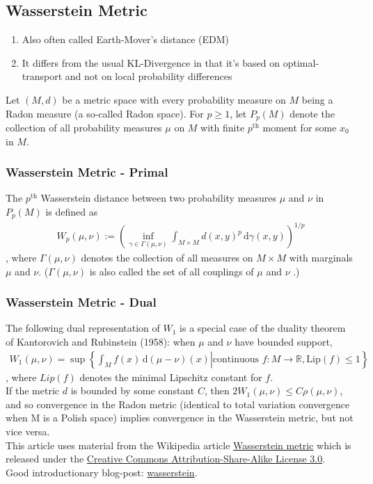 \subsection{Wasserstein Metric}
\begin{enumerate}
	\item Also often called Earth-Mover's distance (EDM)
	\item It differs from the usual KL-Divergence in that it's based on optimal-transport and not on local probability differences
\end{enumerate}
Let $(M,d)$ be a metric space with every probability measure on $M$ being a Radon measure (a so-called Radon space). For $p\geq 1$, let $\displaystyle P_{p}(M)$ denote the collection of all probability measures $\mu$ on $M$ with finite $\displaystyle p^{\text{th}}$ moment for some $x_{0}$ in $M$.
\subsubsection{Wasserstein Metric - Primal}
The $\displaystyle p^{\text{th}}$ Wasserstein distance between two probability measures $\mu$ and $\nu$ in $\displaystyle P_{p}(M)$ is defined as
\begin{align*}
W_{{p}}(\mu ,\nu ):=\left(\inf _{{\gamma \in \Gamma (\mu ,\nu )}}\int _{{M\times M}}d(x,y)^{{p}}\,{\mathrm  {d}}\gamma (x,y)\right)^{{1/p}}
\end{align*},
where $\displaystyle \Gamma (\mu ,\nu )$ denotes the collection of all measures on $M\times M$ with marginals $\mu$  and $\nu$. ($\Gamma (\mu ,\nu )$ is also called the set of all couplings of $\mu$  and $\nu$ .)
\subsubsection{Wasserstein Metric - Dual}
The following dual representation of $W_1$ is a special case of the duality theorem of Kantorovich and Rubinstein (1958): when $\mu$ and $\nu$ have bounded support,
\begin{align*}
W_{{1}}(\mu ,\nu )=\sup \left\{\left.\int _{{M}}f(x)\,{\mathrm  {d}}(\mu -\nu )(x)\right|{\mbox{continuous }}f:M\to {\mathbb  {R}},{\mathrm  {Lip}}(f)\leq 1\right\}
\end{align*},
where $Lip(f)$ denotes the minimal Lipschitz constant for $f$.\\
If the metric $d$ is bounded by some constant $C$, then $2W_{{1}}(\mu ,\nu )\leq C\rho (\mu ,\nu )$,
and so convergence in the Radon metric (identical to total variation convergence when M is a Polish space) implies convergence in the Wasserstein metric, but not vice versa.\\
This article uses material from the Wikipedia article
\href{https://en.wikipedia.org/wiki/Wasserstein_metric}{Wasserstein metric} which is released under the \href{https://creativecommons.org/licenses/by-sa/3.0/}{Creative Commons Attribution-Share-Alike License 3.0}.\\
Good introductionary blog-post: \href{https://vincentherrmann.github.io/blog/wasserstein/}{wasserstein}.

